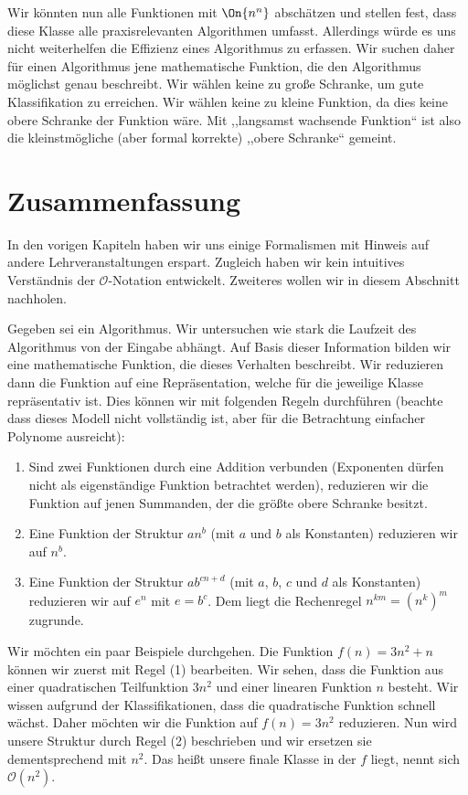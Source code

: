 Wir könnten nun alle Funktionen mit $\On{n^n}$ abschätzen und stellen fest, dass diese Klasse alle praxisrelevanten Algorithmen umfasst. Allerdings würde es uns nicht weiterhelfen die Effizienz eines Algorithmus zu erfassen. Wir suchen daher für einen Algorithmus jene mathematische Funktion, die den Algorithmus möglichst genau beschreibt. Wir wählen keine zu große Schranke, um gute Klassifikation zu erreichen. Wir wählen keine zu kleine Funktion, da dies keine obere Schranke der Funktion wäre. Mit ,,langsamst wachsende Funktion`` ist also die kleinstmögliche (aber formal korrekte) ,,obere Schranke`` gemeint.
%
\section{Zusammenfassung}
%
In den vorigen Kapiteln haben wir uns einige Formalismen mit Hinweis auf andere Lehrveranstaltungen erspart. Zugleich haben wir kein intuitives Verständnis der $\mathcal{O}$-Notation entwickelt. Zweiteres wollen wir in diesem Abschnitt nachholen.

Gegeben sei ein Algorithmus. Wir untersuchen wie stark die Laufzeit des Algorithmus von der Eingabe abhängt. Auf Basis dieser Information bilden wir eine mathematische Funktion, die dieses Verhalten beschreibt. Wir reduzieren dann die Funktion auf eine Repräsentation, welche für die jeweilige Klasse repräsentativ ist. Dies können wir mit folgenden Regeln durchführen (beachte dass dieses Modell nicht vollständig ist, aber für die Betrachtung einfacher Polynome ausreicht):
%
\begin{enumerate}
  \item Sind zwei Funktionen durch eine Addition verbunden (Exponenten dürfen nicht als eigenständige Funktion betrachtet werden), reduzieren wir die Funktion auf jenen Summanden, der die größte obere Schranke besitzt.
  \item Eine Funktion der Struktur $an^{b}$ (mit $a$ und $b$ als Konstanten) reduzieren wir auf $n^b$.
  \item Eine Funktion der Struktur $ab^{cn + d}$ (mit $a$, $b$, $c$ und $d$ als Konstanten) reduzieren wir auf $e^n$ mit $e=b^c$. Dem liegt die Rechenregel $n^{km} = {(n^k)}^m$ zugrunde.
\end{enumerate}

Wir möchten ein paar Beispiele durchgehen. Die Funktion $f(n) = 3n^2 + n$ können wir zuerst mit Regel (1) bearbeiten. Wir sehen, dass die Funktion aus einer quadratischen Teilfunktion $3n^2$ und einer linearen Funktion $n$ besteht. Wir wissen aufgrund der Klassifikationen, dass die quadratische Funktion schnell wächst. Daher möchten wir die Funktion auf $f(n) = 3n^2$ reduzieren. Nun wird unsere Struktur durch Regel (2) beschrieben und wir ersetzen sie dementsprechend mit $n^2$. Das heißt unsere finale Klasse in der $f$ liegt, nennt sich $\mathcal{O}(n^2)$.


